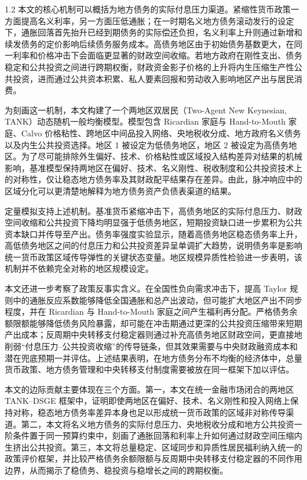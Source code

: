 \documentclass[12pt,UTF8]{ctexart}
\begin{document}
\begin{spacing}{1.2}
		本文的核心机制可以概括为地方债务的实际付息压力渠道。紧缩性货币政策一方面提高名义利率，另一方面压低通胀；在一时期名义地方债务滚动发行的设定下，通胀回落首先抬升已经到期债务的实际偿还负担，名义利率上升则通过新增和续发债务的定价影响后续债务服务成本。高债务地区由于初始债务基数更大，在同一利率和价格冲击下会面临更显著的财政空间收缩。若地方政府在刚性支出、债务稳定和公共投资之间进行跨期权衡，财政资金影子价格的上升将内生压缩生产性公共投资，进而通过公共资本积累、私人要素回报和劳动收入影响地区产出与居民消费。
		
		为刻画这一机制，本文构建了一个两地区双居民（Two-Agent New Keynesian, TANK）动态随机一般均衡模型。模型包含 Ricardian 家庭与 Hand-to-Mouth 家庭、Calvo 价格粘性、跨地区中间品投入网络、央地税收分成、地方政府名义债务以及内生公共投资选择。地区 1 被设定为低债务地区，地区 2 被设定为高债务地区。为了尽可能排除外生偏好、技术、价格粘性或区域投入结构差异对结果的机械影响，基准模型保持两地区在偏好、技术、名义刚性、税收制度和公共投资技术上的对称性，仅让稳态地方债务率及其财政配平结果存在差异。由此，脉冲响应中的区域分化可以更清楚地解释为地方债务资产负债表渠道的结果。
		
		定量模拟支持上述机制。基准货币紧缩冲击下，高债务地区的实际付息压力、财政空间收缩和公共投资下降均明显强于低债务地区，短期投资缺口进一步累积为公共资本缺口并传导至产出。债务率强度实验显示，随着高债务地区稳态债务率上升，高低债务地区之间的付息压力和公共投资差异呈单调扩大趋势，说明债务率是影响统一货币政策区域传导弹性的关键状态变量。地区规模异质性检验进一步表明，该机制并不依赖完全对称的地区规模设定。
		
		本文还进一步考察了政策反事实含义。在全国性负向需求冲击下，提高 Taylor 规则中的通胀反应系数能够降低全国通胀和总产出波动，但可能扩大地区产出不同步程度，并在 Ricardian 与 Hand-to-Mouth 家庭之间产生福利再分配。严格债务余额限额能够降低债务风险暴露，却可能在冲击期通过更深的公共投资压缩带来短期产出成本；反周期中央转移支付稳定器则通过补充高债务地区财政空间，更直接地削弱“付息压力--公共投资收缩”的传导链条，但其效果需要与中央财政融资成本和潜在兜底预期一并评估。上述结果表明，在地方债务分布不均衡的经济体中，总量货币政策、地方债务管理和中央转移支付制度需要被放在同一框架下加以评估。
		
		本文的边际贡献主要体现在三个方面。第一，本文在统一金融市场闭合的两地区 TANK--DSGE 框架中，证明即使两地区在偏好、技术、名义刚性和投入网络上保持对称，稳态地方债务率差异本身也足以形成统一货币政策的区域非对称传导渠道。第二，本文将名义地方债务的实际付息压力、央地税收分成和地方公共投资一阶条件置于同一预算约束中，刻画了通胀回落和利率上升如何通过财政空间压缩内生挤出公共投资。第三，本文将总量稳定、区域同步和异质性居民福利纳入统一的政策评价框架，并比较严格债务余额限额与反周期中央转移支付稳定器的不同作用边界，从而揭示了稳债务、稳投资与稳增长之间的跨期权衡。
		

\end{spacing}
\end{document}
